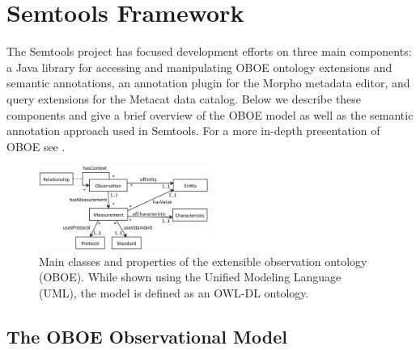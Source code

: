 
\section{Semtools Framework}
\label{sec:framework}

The Semtools project has focused development efforts on three main
components: a Java library for accessing and manipulating OBOE
ontology extensions and semantic annotations, an annotation plugin for
the Morpho metadata editor, and query extensions for the Metacat data
catalog. Below we describe these components and give a brief
overview of the OBOE model as well as the semantic annotation approach
used in Semtools. For a more in-depth presentation of OBOE see
\cite{madin07:_ontol_for_descr_and_synth,bowers08}.

\begin{figure}[!t]
  \centering
  \includegraphics[width=0.494\textwidth]{images/oboe}
  \caption{Main classes and properties of the extensible observation
    ontology (OBOE). While shown using the Unified Modeling Language (UML),
    the model is defined as an OWL-DL ontology.}
  \label{fig:oboe}
  \vspace{-12pt}
\end{figure}

\subsection{The OBOE Observational Model}  


